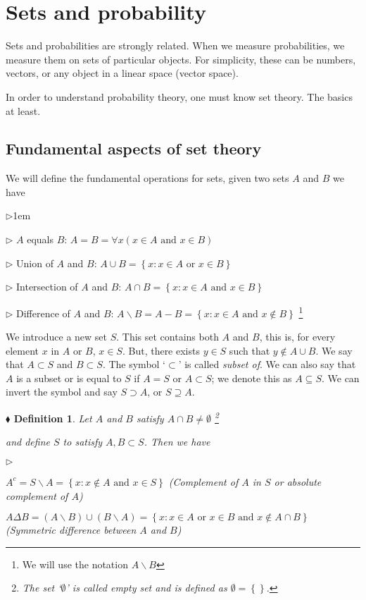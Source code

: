 \documentclass{report}
\newcommand*{\daggerfootnote}[1]{%
  \begingroup
  \renewcommand*{\thefootnote}{\fnsymbol{footnote}}%
  \footnote{#1}%
  \endgroup
}
\newtheorem{definition}{$\blacklozenge$ Definition}[chapter]
\begin{document}
\section{Sets and probability}
Sets and probabilities are strongly related. When we measure probabilities, we measure them on sets of particular 
objects. For simplicity, these can be numbers, vectors, or any object in a linear space (vector space).

In order to understand probability theory, one must know set theory. The basics at least.
\subsection{Fundamental aspects of set theory}
We will define the fundamental operations for sets, given two sets $A$ and $B$ we have 
\begin{list}{$\triangleright$}{1em}
    \item[$\triangleright$] $A$ equals $B$: $A = B = \forall x (x\in A \text{ and } x\in B)$
    \item[$\triangleright$] Union of $A$ and $B$: $A\cup B = \left\{x: x\in A \text{ or } x \in B\right\}$
    \item[$\triangleright$] Intersection of $A$ and $B$: $A\cap B = \left\{x: x\in A \text{ and } x \in B\right\}$
    \item[$\triangleright$] Difference of $A$ and $B$: $A\backslash B = A - B= \left\{x: x\in A \text{ and } x\notin B\right\}$\daggerfootnote{We will use the notation $A\backslash B$}
\end{list}

We introduce a new set $S$. This set contains both $A$ and $B$, this is, for every element $x$ in $A$ or $B$, 
$x\in S$. But, there exists $y\in S$ such that $y\notin A\cup B$. We say that $A\subset S$ and $B\subset S$. The 
symbol `$\subset$' is called \textit{subset of}. We can also say that $A$ is a subset or is equal to $S$ if $A=S$
or $A \subset S$; we denote this as $A\subseteq S$. We can invert the symbol and say $S\supset A$, or $S \supseteq A$.

\begin{definition}
    Let $A$ and $B$ satisfy $A\cap B \neq \emptyset$\daggerfootnote{The set `$\emptyset$' is called \textit{empty set} and is defined as $\emptyset = \left\{\right\}$. }
    and define $S$ to satisfy $A,B\subset S$. Then we have 
    \begin{list}{$\triangleright$}{}
        \item $A^{c} = S\backslash A = \left\{x: x\notin A \text{ and } x\in S\right\}$ (Complement of $A$ in $S$ or absolute complement of $A$)
        \item $A\Delta B = (A\backslash B) \cup (B \backslash A) = \left\{x: x\in A \text{ or } x\in B \text{ and } x \notin A\cap B\right\}$ (Symmetric difference between $A$ and $B$)
    \end{list}
\end{definition}
\end{document}
